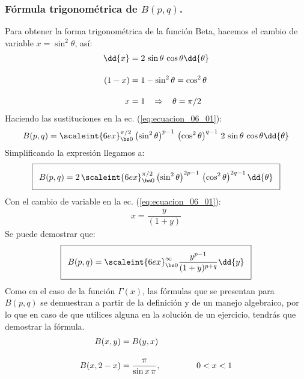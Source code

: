 \subsubsection{Fórmula trigonométrica de \texorpdfstring{$B(p,q)$}{B(p, q)}.}

Para obtener la forma trigonométrica de la función Beta, hacemos el cambio de variable $x = \sin^{2} \theta$, así:
\begin{align*}
\dd{x} &= 2 \, \sin \theta \, \cos \theta \dd{\theta} \\[1em]
(1 - x) &= 1 - \sin^{2} \theta = \cos^{2} \theta \\[1em]
x &= 1 \hspace{0.3cm} \Rightarrow \hspace{0.3cm} \theta = \pi/2
\end{align*}
Haciendo las sustituciones en la ec. (\ref{eq:ecuacion_06_01}):
{\fontsize{12}{12}\selectfont
\begin{align}
B(p, q) = \scaleint{6ex}_{\bs 0}^{\pi/2} \left( \sin^{2} \theta \right)^{p-1} \, \left( \cos^{2} \theta \right)^{q-1} \, 2 \, \sin \theta \, \cos \theta \dd{\theta}
\end{align}}
Simplificando la expresión llegamos a:
{\fontsize{12}{12}\selectfont
\begin{align}
\addtolength{\fboxsep}{5pt}\boxed{B(p, q) = 2 \, \scaleint{6ex}_{\bs 0}^{\pi/2} \left( \sin^{2} \theta \right)^{2p-1} \, \left( \cos^{2} \theta \right)^{2q-1} \dd{\theta}}
\label{eq:ecuacion_06_04}
\end{align}}
Con el cambio de variable en la ec. (\ref{eq:ecuacion_06_01}):
\begin{align*}
x = \dfrac{y}{(1 + y)}
\end{align*}
Se puede demostrar que:
\begin{align}
\addtolength{\fboxsep}{5pt}\boxed{B(p, q) = \scaleint{6ex}_{\bs 0}^{\infty} \dfrac{y^{p-1}}{(1 + y)^{p+q}} \dd{y}}
\label{eq:ecuacion_06_05}
\end{align}   
Como en el caso de la función $\Gamma (x)$, las fórmulas que se presentan para $B(p, q)$ se demuestran a partir de la definición y de un manejo algebraico, por lo que en caso de que utilices alguna en la solución de un ejercicio, tendrás que demostrar la fórmula.
\begin{align*}
B (x, y) &= B (y, x) \\[1em]
B (x, 2-x) &= \dfrac{\pi}{\sin x \, \pi}, \hspace{1.5cm} 0 < x < 1   
\end{align*}

